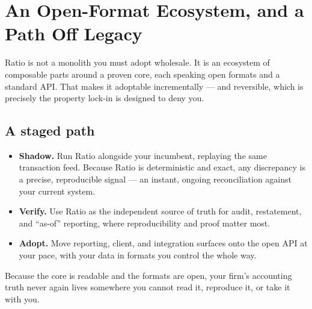 \section{An Open-Format Ecosystem, and a Path Off Legacy}

Ratio is not a monolith you must adopt wholesale. It is an ecosystem of composable
parts around a proven core, each speaking open formats and a standard API. That
makes it adoptable incrementally --- and reversible, which is precisely the
property lock-in is designed to deny you.



\subsection{A staged path}
\begin{itemize}
  \item \textbf{Shadow.} Run Ratio alongside your incumbent, replaying the same
  transaction feed. Because Ratio is deterministic and exact, any discrepancy is a
  precise, reproducible signal --- an instant, ongoing reconciliation against your
  current system.
  \item \textbf{Verify.} Use Ratio as the independent source of truth for audit,
  restatement, and ``as-of'' reporting, where reproducibility and proof matter most.
  \item \textbf{Adopt.} Move reporting, client, and integration surfaces onto the
  open API at your pace, with your data in formats you control the whole way.
\end{itemize}

\noindent Because the core is readable and the formats are open, your firm's
accounting truth never again lives somewhere you cannot read it, reproduce it, or
take it with you.
